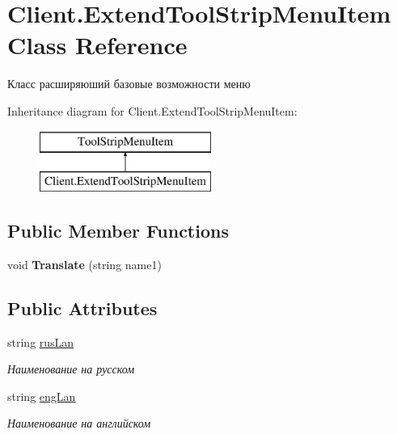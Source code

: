\hypertarget{class_client_1_1_extend_tool_strip_menu_item}{}\section{Client.\+Extend\+Tool\+Strip\+Menu\+Item Class Reference}
\label{class_client_1_1_extend_tool_strip_menu_item}


Класс расширяюший базовые возможности меню  


Inheritance diagram for Client.\+Extend\+Tool\+Strip\+Menu\+Item\+:\begin{figure}[H]
\begin{center}
\leavevmode
\includegraphics[height=2.000000cm]{class_client_1_1_extend_tool_strip_menu_item}
\end{center}
\end{figure}
\subsection*{Public Member Functions}
\begin{DoxyCompactItemize}
\item 
\hypertarget{class_client_1_1_extend_tool_strip_menu_item_a148e298d46585db26cc44a47ad50292f}{}\label{class_client_1_1_extend_tool_strip_menu_item_a148e298d46585db26cc44a47ad50292f} 
void {\bfseries Translate} (string name1)
\end{DoxyCompactItemize}
\subsection*{Public Attributes}
\begin{DoxyCompactItemize}
\item 
string \hyperlink{class_client_1_1_extend_tool_strip_menu_item_abae1637b49f6f25f2a08eaa0a1e60fdc}{rus\+Lan}
\begin{DoxyCompactList}\small\item\em Наименование на русском \end{DoxyCompactList}\item 
string \hyperlink{class_client_1_1_extend_tool_strip_menu_item_a71d1d698ca4315da70a0c2553c017c5f}{eng\+Lan}
\begin{DoxyCompactList}\small\item\em Наименование на английском \end{DoxyCompactList}\end{DoxyCompactItemize}


